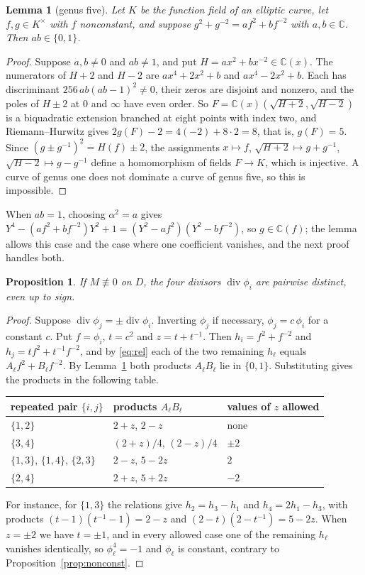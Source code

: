 \documentclass[11pt]{amsart}
\newtheorem{lemma}[theorem]{Lemma}
\newtheorem{proposition}[theorem]{Proposition}
\theoremstyle{definition}
\newcommand{\C}{\mathbb{C}}
\newcommand{\Div}{\operatorname{div}}
\begin{document}
\begin{lemma}[genus five]\label{lem:g5}
Let $K$ be the function field of an elliptic curve, let $f,g\in K^\times$ with $f$ nonconstant, and suppose
$g^2+g^{-2}=af^2+bf^{-2}$ with $a,b\in\C$. Then $ab\in\{0,1\}$.
\end{lemma}

\begin{proof}
Suppose $a,b\ne0$ and $ab\ne1$, and put $H=ax^2+bx^{-2}\in\C(x)$. The numerators of $H+2$ and $H-2$ are
$ax^4+2x^2+b$ and $ax^4-2x^2+b$. Each has discriminant $256\,ab(ab-1)^2\ne0$, their zeros are disjoint and nonzero,
and the poles of $H\pm2$ at $0$ and $\infty$ have even order. So $F=\C(x)(\sqrt{H+2},\sqrt{H-2})$ is a biquadratic
extension branched at eight points with index two, and Riemann--Hurwitz gives $2g(F)-2=4(-2)+8\cdot2=8$, that is,
$g(F)=5$. Since $(g\pm g^{-1})^2=H(f)\pm2$, the assignments $x\mapsto f$, $\sqrt{H+2}\mapsto g+g^{-1}$,
$\sqrt{H-2}\mapsto g-g^{-1}$ define a homomorphism of fields $F\to K$, which is injective. A curve of genus one
does not dominate a curve of genus five, so this is impossible.
\end{proof}

When $ab=1$, choosing $\alpha^2=a$ gives $Y^4-(af^2+bf^{-2})Y^2+1=(Y^2-af^2)(Y^2-bf^{-2})$, so $g\in\C(f)$; the lemma
allows this case and the case where one coefficient vanishes, and the next proof handles both.

\begin{proposition}\label{prop:distinct}
If $M\not\equiv0$ on $D$, the four divisors $\Div\phi_i$ are pairwise distinct, even up to sign.
\end{proposition}

\begin{proof}
Suppose $\Div\phi_j=\pm\Div\phi_i$. Inverting $\phi_j$ if necessary, $\phi_j=c\,\phi_i$ for a constant $c$. Put
$f=\phi_i$, $t=c^2$ and $z=t+t^{-1}$. Then $h_i=f^2+f^{-2}$ and $h_j=tf^2+t^{-1}f^{-2}$, and by \eqref{eq:rel} each of
the two remaining $h_\ell$ equals $A_\ell f^2+B_\ell f^{-2}$. By Lemma~\ref{lem:g5} both products $A_\ell B_\ell$ lie
in $\{0,1\}$. Substituting gives the products in the following table.
\begin{center}\small
\begin{tabular}{lll}
\toprule
repeated pair $\{i,j\}$ & products $A_\ell B_\ell$ & values of $z$ allowed\\
\midrule
$\{1,2\}$ & $2+z$, $2-z$ & none\\
$\{3,4\}$ & $(2+z)/4$, $(2-z)/4$ & $\pm2$\\
$\{1,3\}$, $\{1,4\}$, $\{2,3\}$ & $2-z$, $5-2z$ & $2$\\
$\{2,4\}$ & $2+z$, $5+2z$ & $-2$\\
\bottomrule
\end{tabular}
\end{center}
For instance, for $\{1,3\}$ the relations give $h_2=h_3-h_1$ and $h_4=2h_1-h_3$, with products
$(t-1)(t^{-1}-1)=2-z$ and $(2-t)(2-t^{-1})=5-2z$. When $z=\pm2$ we have $t=\pm1$, and in every allowed case one of
the remaining $h_\ell$ vanishes identically, so $\phi_\ell^4=-1$ and $\phi_\ell$ is constant, contrary to
Proposition~\ref{prop:nonconst}.
\end{proof}
\end{document}

